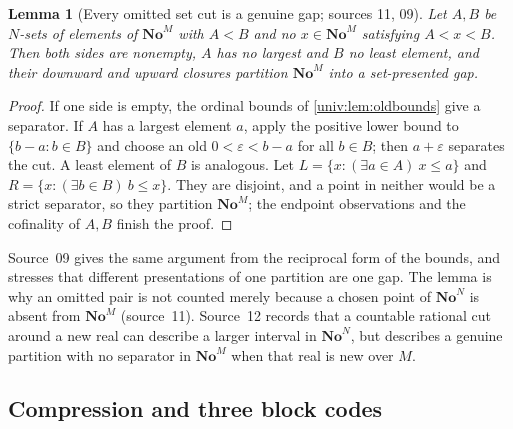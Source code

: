 \documentclass[11pt,letterpaper]{article}
\numberwithin{equation}{section}
\newtheorem{lemma}[lemma]{Lemma}
\theoremstyle{definition}
\theoremstyle{remark}
\newcommand{\No}{\mathbf{No}}
\newcommand{\NoM}{\No^{M}}
\newcommand{\NoN}{\No^{N}}
\begin{document}
\begin{lemma}[Every omitted set cut is a genuine gap; sources 11, 09]\label{univ:gs:lem:omittedgap}
Let $A,B$ be $N$-sets of elements of $\NoM$ with $A<B$ and no $x\in\NoM$ satisfying
$A<x<B$. Then both sides are nonempty, $A$ has no largest and $B$ no least
element, and their downward and upward closures partition $\NoM$ into a
set-presented gap.
\end{lemma}
\begin{proof}
If one side is empty, the ordinal bounds of \cref{univ:lem:oldbounds} give a
separator. If $A$ has a largest element $a$, apply the positive lower bound to
$\{b-a:b\in B\}$ and choose an old $0<\varepsilon<b-a$ for all $b\in B$; then
$a+\varepsilon$ separates the cut. A least element of $B$ is analogous. Let
$L=\{x:(\exists a\in A)\ x\le a\}$ and $R=\{x:(\exists b\in B)\ b\le x\}$. They are
disjoint, and a point in neither would be a strict separator, so they partition
$\NoM$; the endpoint observations and the cofinality of $A,B$ finish the proof.
\end{proof}

Source~09 gives the same argument from the reciprocal form of the bounds, and
stresses that different presentations of one partition are one gap. The lemma is
why an omitted pair is not counted merely because a chosen point of $\NoN$ is
absent from $\NoM$ (source~11). Source~12 records that a countable rational cut
around a new real can describe a larger interval in $\NoN$, but describes a
genuine partition with no separator in $\NoM$ when that real is new over $M$.

\subsection{Compression and three block codes}
\end{document}
